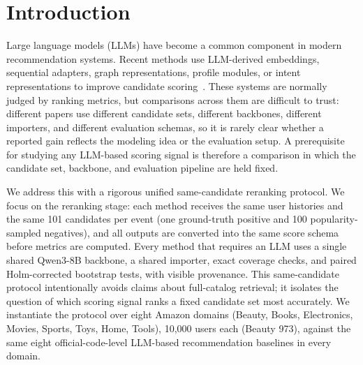 \section{Introduction}
\label{sec:introduction}

Large language models (LLMs) have become a common component in modern
recommendation systems. Recent methods use LLM-derived embeddings,
sequential adapters, graph representations, profile modules, or intent
representations to improve candidate scoring~\cite{llm2rec,llmemb,llmesr,irllrec,proex,promax,elmrec,rlmrec}.
These systems are normally judged by ranking metrics, but comparisons across
them are difficult to trust: different papers use different candidate sets,
different backbones, different importers, and different evaluation schemas, so
it is rarely clear whether a reported gain reflects the modeling idea or the
evaluation setup. A prerequisite for studying any LLM-based scoring signal is
therefore a comparison in which the candidate set, backbone, and evaluation
pipeline are held fixed.

We address this with a rigorous unified same-candidate reranking protocol. We
focus on the reranking stage: each method receives the same user histories and
the same 101 candidates per event (one ground-truth positive and 100
popularity-sampled negatives), and all outputs are converted into the same
score schema before metrics are computed. Every method that requires an LLM
uses a single shared Qwen3-8B backbone, a shared importer, exact coverage
checks, and paired Holm-corrected bootstrap tests, with visible provenance.
This same-candidate protocol intentionally avoids claims about full-catalog
retrieval; it isolates the question of which scoring signal ranks a fixed
candidate set most accurately. We instantiate the protocol over eight Amazon
domains (Beauty, Books, Electronics, Movies, Sports, Toys, Home, Tools),
10{,}000 users each (Beauty 973), against the same eight official-code-level
LLM-based recommendation baselines in every domain.

